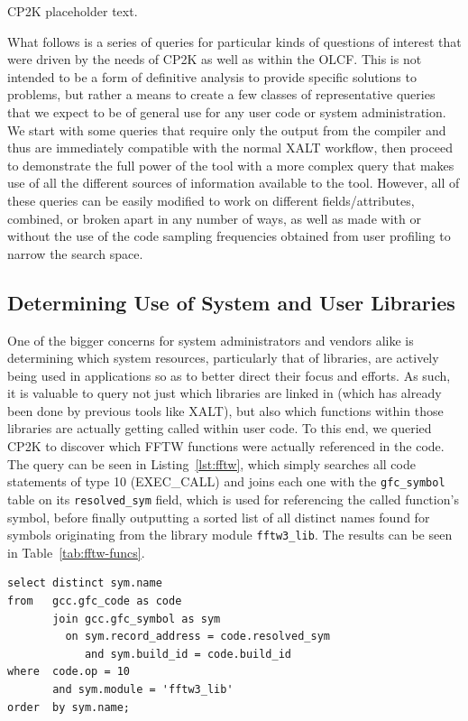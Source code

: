 CP2K placeholder text.

What follows is a series of queries for particular kinds of questions of interest that were driven by the needs of CP2K as well as within the \acs{OLCF}.
This is not intended to be a form of definitive analysis to provide specific solutions to problems, but rather a means to create a few classes of representative queries that we expect to be of general use for any user code or system administration.
We start with some queries that require only the output from the compiler and thus are immediately compatible with the normal XALT workflow, then proceed to demonstrate the full power of the tool with a more complex query that makes use of all the different sources of information available to the tool.
However, all of these queries can be easily modified to work on different fields/attributes, combined, or broken apart in any number of ways, as well as made with or without the use of the code sampling frequencies obtained from user profiling to narrow the search space.

\subsection{Determining Use of System and User Libraries}
One of the bigger concerns for system administrators and vendors alike is determining which system resources, particularly that of libraries, are actively being used in applications so as to better direct their focus and efforts.
As such, it is valuable to query not just which libraries are linked in (which has already been done by previous tools like XALT), but also which functions within those libraries are actually getting called within user code.
To this end, we queried CP2K to discover which \ac{FFTW} functions were actually referenced in the code.
The query can be seen in Listing~\ref{lst:fftw}, which simply searches all code statements of type 10 (EXEC\_CALL) and joins each one with the \texttt{gfc\_symbol} table on its \texttt{resolved\_sym} field, which is used for referencing the called function's symbol, before finally outputting a sorted list of all distinct names found for symbols originating from the library module \texttt{fftw3\_lib}.
The results can be seen in Table~\ref{tab:fftw-funcs}.

\begin{lstlisting}[caption=Querying for Use of Library Functions, label=lst:fftw]
select distinct sym.name
from   gcc.gfc_code as code
       join gcc.gfc_symbol as sym
         on sym.record_address = code.resolved_sym
            and sym.build_id = code.build_id
where  code.op = 10
       and sym.module = 'fftw3_lib'
order  by sym.name;
\end{lstlisting}

